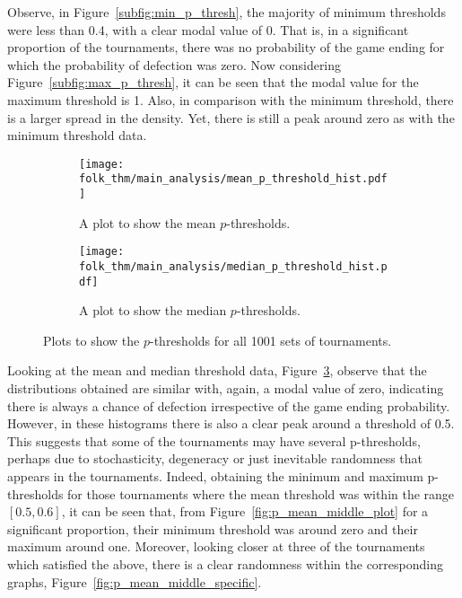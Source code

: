 Observe, in Figure~\ref{subfig:min_p_thresh}, the majority of minimum thresholds
were less than 0.4, with a clear modal value of 0. That is, in a significant
proportion of the tournaments, there was no probability of the game ending for
which the probability of defection was zero. Now considering
Figure~\ref{subfig:max_p_thresh}, it can be seen that the modal value for the
maximum threshold is 1.
Also, in comparison with the minimum threshold, there is a larger spread in the
density. Yet, there is still a peak around zero as with the minimum threshold
data. 

\begin{figure}
    \begin{subfigure}{.45\textwidth}
        \centering
        \texttt{[image: folk\_thm/main\_analysis/mean\_p\_threshold\_hist.pdf]}
        \caption{A plot to show the mean \(p\)-thresholds.}\label{subfig:mean_p_thresh}
    \end{subfigure}
    \begin{subfigure}{.45\textwidth}
        \centering
        \texttt{[image: folk\_thm/main\_analysis/median\_p\_threshold\_hist.pdf]}
        \caption{A plot to show the median \(p\)-thresholds.}\label{subfig:median_p_thresh}
    \end{subfigure}
    \caption{Plots to show the \(p\)-thresholds for all 1001 sets of tournaments.}\label{fig:mean_median_p_thresh}
\end{figure}


Looking at the mean and median threshold data,
Figure~\ref{fig:mean_median_p_thresh}, observe that the distributions obtained
are similar with, again, a modal value of zero, indicating there is always a
chance of defection irrespective of the game ending probability. However, in
these histograms there is also a clear peak around a threshold of 0.5. This
suggests that some of the tournaments may have several p-thresholds, perhaps due
to stochasticity, degeneracy or just inevitable randomness that appears in the 
tournaments. Indeed, obtaining the minimum and maximum
p-thresholds for those tournaments where the mean threshold was within the range
\([0.5, 0.6]\), it can be seen that, from Figure~\ref{fig:p_mean_middle_plot}
for a significant proportion, their minimum
threshold was around zero and their maximum around one. Moreover, looking closer
at three of the tournaments which satisfied the above, there is a clear
randomness within the corresponding graphs, Figure~\ref{fig:p_mean_middle_specific}.


